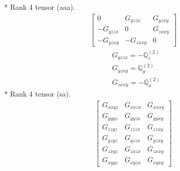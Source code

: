 \documentclass[fleqn,8pt,landscape]{jsarticle}
\begin{document}
* Rank 4 tensor (aaa).
\begin{align*}
\begin{bmatrix} 0 & G_{yzzx} & G_{yzxy} \\ - G_{yzzx} & 0 & G_{zxxy} \\ - G_{yzxy} & - G_{zxxy} & 0 \end{bmatrix}
\end{align*}
\begin{align*}
& G_{yzzx} = - \mathbb{Q}_{z}^{(2)} \\
& G_{yzxy} = \mathbb{Q}_{y}^{(2)} \\
& G_{zxxy} = - \mathbb{Q}_{x}^{(2)}
\end{align*}
* Rank 4 tensor (sa).
\begin{align*}
\begin{bmatrix} G_{xxyz} & G_{xxzx} & G_{xxxy} \\ G_{yyyz} & G_{yyzx} & G_{yyxy} \\ G_{zzyz} & G_{zzzx} & G_{zzxy} \\ G_{yzyz} & G_{yzzx} & G_{yzxy} \\ G_{zxyz} & G_{zxzx} & G_{zxxy} \\ G_{xyyz} & G_{xyzx} & G_{xyxy} \end{bmatrix}
\end{align*}
\end{document}
